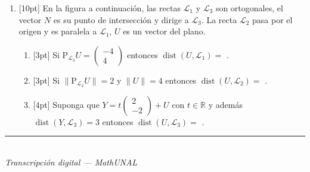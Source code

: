\documentclass[11pt]{article}
\newcommand{\vect}[2]{\begin{pmatrix}#1\\#2\end{pmatrix}}
\newcommand{\examfooter}{%
  \vfill
  \rule{\linewidth}{0.4pt}\\[1pt]
  {\scriptsize\textit{Transcripción digital --- MathUNAL}\hfill\textcolor{unalblue}{\textbf{\thepage}}}
}
\newcommand{\nota}[1]{{\small\itshape\color{unalblue!70!black} #1}}
\begin{document}
\begin{enumerate}
\begin{enumerate}[label=(\alph*)]
\item{}[3pt] Si $m_1=\dfrac{1}{2}$ entonces $\tan\alpha_2=$ \underline{\hspace{3cm}}.
\item{}[4pt] Si $\mathcal{L}_2: 3x+2y-9=0$ y además $\mathcal{L}_3=\left\{t\vect{1}{3}+\vect{2}{0}: t\in\mathbb{R}\right\}$, entonces $\cos\theta=$ \underline{\hspace{3cm}}.
\item{}[3pt] Si $\tan\alpha_1=1$ y $m_3=3$ entonces $\tan\theta=$ \underline{\hspace{3cm}}.
\end{enumerate}

\nota{Indicación. Se recuerda que $\tan(\beta+\gamma)=\dfrac{\tan\beta+\tan\gamma}{1-\tan\beta\tan\gamma}$ y $\tan(\beta-\gamma)=\dfrac{\tan\beta-\tan\gamma}{1+\tan\beta\tan\gamma}$.}

\item{}[10pt] En la figura a continuación, las rectas $\mathcal{L}_1$ y $\mathcal{L}_3$ son ortogonales, el vector $N$ es su punto de intersección y dirige a $\mathcal{L}_3$. La recta $\mathcal{L}_2$ pasa por el origen y es paralela a $\mathcal{L}_1$, $U$ es un vector del plano.

\begin{center}
\end{center}

\begin{enumerate}[label=(\alph*)]
\item{}[3pt] Si $\mathrm{P}_{\mathcal{L}_3}U=\vect{-4}{4}$ entonces $\operatorname{dist}(U,\mathcal{L}_1)=$ \underline{\hspace{3cm}}.
\item{}[3pt] Si $\|\mathrm{P}_{\mathcal{L}_2}U\|=2$ y $\|U\|=4$ entonces $\operatorname{dist}(U,\mathcal{L}_2)=$ \underline{\hspace{3cm}}.
\item{}[4pt] Suponga que $Y=t\vect{2}{-2}+U$ con $t\in\mathbb{R}$ y además $\operatorname{dist}(Y,\mathcal{L}_3)=3$ entonces $\operatorname{dist}(U,\mathcal{L}_3)=$ \underline{\hspace{3cm}}.
\end{enumerate}

\end{enumerate}

\examfooter
\end{document}
